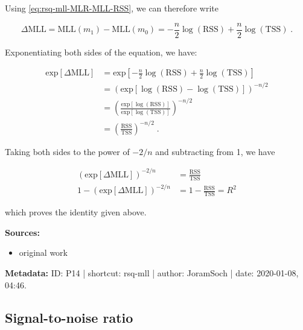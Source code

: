 \documentclass[a4paper,12pt]{book}
\begin{document}
Using \eqref{eq:rsq-mll-MLR-MLL-RSS}, we can therefore write

\begin{equation} \label{eq:rsq-mll-MLR-DMLL}
\Delta\mathrm{MLL} = \mathrm{MLL}(m_1) - \mathrm{MLL}(m_0) = - \frac{n}{2} \log(\mathrm{RSS}) + \frac{n}{2} \log(\mathrm{TSS}) \; .
\end{equation}

Exponentiating both sides of the equation, we have:

\begin{equation} \label{eq:rsq-mll-MLR-DMLL-RTSS}
\begin{split}
\mathrm{exp}[\Delta\mathrm{MLL}] &= \mathrm{exp} \left[ - \frac{n}{2} \log(\mathrm{RSS}) + \frac{n}{2} \log(\mathrm{TSS}) \right] \\
&= \left( \mathrm{exp} \left[ \log(\mathrm{RSS}) - \log(\mathrm{TSS}) \right] \right)^{-n/2} \\
&= \left( \frac{\mathrm{exp}[\log(\mathrm{RSS})]}{\mathrm{exp}[\log(\mathrm{TSS})]} \right)^{-n/2} \\
&= \left( \frac{\mathrm{RSS}}{\mathrm{TSS}} \right)^{-n/2} \; .
\end{split}
\end{equation}

Taking both sides to the power of $-2/n$ and subtracting from 1, we have

\begin{equation} \label{eq:rsq-mll-MLR-DMLL-R2}
\begin{split}
\left( \mathrm{exp}[\Delta\mathrm{MLL}] \right)^{-2/n} &= \frac{\mathrm{RSS}}{\mathrm{TSS}} \\
1 - \left( \mathrm{exp}[\Delta\mathrm{MLL}] \right)^{-2/n} &= 1 - \frac{\mathrm{RSS}}{\mathrm{TSS}} = R^2
\end{split}
\end{equation}

which proves the identity given above.

\vspace{1em}
\textbf{Sources:}
\begin{itemize}
\item original work\end{itemize}


\vspace{1em}
\textbf{Metadata:} ID: P14 | shortcut: rsq-mll | author: JoramSoch | date: 2020-01-08, 04:46.


\subsection{Signal-to-noise ratio}
\end{document}
